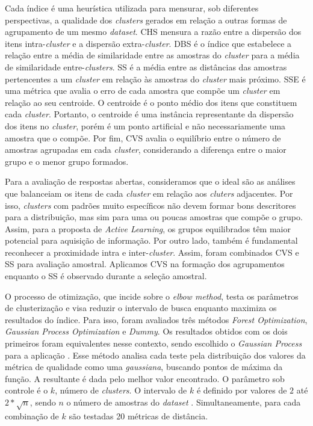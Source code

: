 Cada índice é uma heurística utilizada para mensurar, sob diferentes perspectivas, a qualidade dos \textit{clusters} gerados em relação a outras formas de agrupamento de um mesmo \textit{dataset}. CHS mensura a razão entre a dispersão dos itens intra-\textit{cluster} e a dispersão extra-\textit{cluster}. DBS é o índice que estabelece a relação entre a média de similaridade entre as amostras do \textit{cluster} para a média de similaridade entre-\textit{clusters}. SS é a média entre as distâncias das amostras pertencentes a um \textit{cluster} em relação às amostras do \textit{cluster} mais próximo. SSE é uma métrica que avalia o erro de cada amostra que compõe um \textit{cluster} em relação ao seu centroide. O centroide é o ponto médio dos itens que constituem cada \textit{cluster}. Portanto, o centroide é uma instância representante da dispersão dos itens no \textit{cluster}, porém é um ponto artificial e não necessariamente uma amostra que o compõe. Por fim, CVS avalia o equilíbrio entre o número de amostras agrupadas em cada \textit{cluster}, considerando a diferença entre o maior grupo e o menor grupo formados.

Para a avaliação de respostas abertas, consideramos que o ideal são as análises que balanceiam os itens de cada \textit{cluster} em relação aos \textit{cluters} adjacentes. Por isso, \textit{clusters} com padrões muito específicos não devem formar bons descritores para a distribuição, mas sim para uma ou poucas amostras que compõe o grupo. Assim, para a proposta de \textit{Active Learning}, os grupos equilibrados têm maior potencial para aquisição de informação. Por outro lado, também é fundamental reconhecer a proximidade intra e inter-\textit{cluster}. Assim, foram combinados CVS e SS para avaliação amostral. Aplicamos CVS na formação dos agrupamentos enquanto o SS é observado durante a seleção amostral.


O processo de otimização, que incide sobre o \textit{elbow method}, testa os parâmetros de clusterização e visa reduzir o intervalo de busca enquanto maximiza os resultados do índice. Para isso, foram avaliados três métodos \textit{Forest Optimization}, \textit{Gaussian Process Optimization} e \textit{Dummy}. Os resultados obtidos com os dois primeiros foram equivalentes nesse contexto, sendo escolhido o \textit{Gaussian Process} para a aplicação \cite{spalenza2019}. Esse método analisa cada teste pela distribuição dos valores da métrica de qualidade como uma \textit{gaussiana}, buscando pontos de máxima da função. A resultante é dada pelo melhor valor encontrado. O parâmetro sob controle é o $ k $, número de \textit{clusters}. O intervalo de $ k $ é definido por valores de $ 2 $ até $ 2 * \sqrt{n} $, sendo $ n $ o número de amostras do \textit{dataset} \cite{han2011}. Simultaneamente, para cada combinação de $ k $ são testadas 20 métricas de distância.

